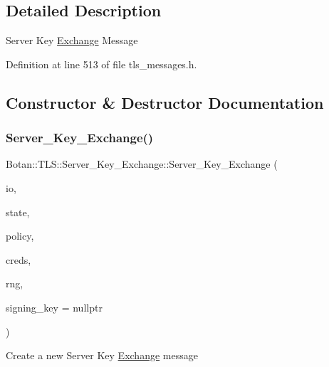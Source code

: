 \subsection{Detailed Description}
Server Key \mbox{\hyperlink{struct_exchange}{Exchange}} Message 

Definition at line 513 of file tls\+\_\+messages.\+h.



\subsection{Constructor \& Destructor Documentation}
\mbox{\label{class_botan_1_1_t_l_s_1_1_server___key___exchange_ae98108eac7f710925eb16550a3adfbb2}} 
\subsubsection{\texorpdfstring{Server\+\_\+\+Key\+\_\+\+Exchange()}{Server\_Key\_Exchange()}\hspace{0.1cm}{\footnotesize\ttfamily [1/2]}}
{\footnotesize\ttfamily Botan\+::\+T\+L\+S\+::\+Server\+\_\+\+Key\+\_\+\+Exchange\+::\+Server\+\_\+\+Key\+\_\+\+Exchange (\begin{DoxyParamCaption}\item[{\mbox{\hyperlink{class_botan_1_1_t_l_s_1_1_handshake___i_o}{Handshake\+\_\+\+IO}} \&}]{io,  }\item[{\mbox{\hyperlink{class_botan_1_1_t_l_s_1_1_handshake___state}{Handshake\+\_\+\+State}} \&}]{state,  }\item[{const Policy \&}]{policy,  }\item[{Credentials\+\_\+\+Manager \&}]{creds,  }\item[{Random\+Number\+Generator \&}]{rng,  }\item[{const Private\+\_\+\+Key $\ast$}]{signing\+\_\+key = {\ttfamily nullptr} }\end{DoxyParamCaption})}

Create a new Server Key \mbox{\hyperlink{struct_exchange}{Exchange}} message 

